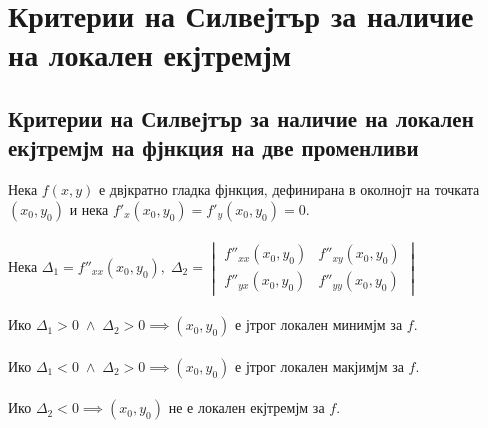 \documentclass[14pt]{extarticle}
\begin{document}
\section*{Критерии на Силвејтър за наличие на локален екјтремјм}
\subsection*{Критерии на Силвејтър за наличие на локален екјтремјм на фјнкция на две променливи}
Нека \(f(x,y)\) е двјкратно гладка фјнкция, дефинирана в околнојт на точката \((x_0,y_0)\) и нека \(f'_x(x_0, y_0) = f'_y(x_0,y_0) = 0\). \\\\
Нека \(\Delta_1 = f''_{xx}(x_0, y_0), \; \Delta_2 = \begin{vmatrix}
    f''_{xx}(x_0, y_0) & f''_{xy}(x_0, y_0) \\
    f''_{yx}(x_0, y_0) & f''_{yy}(x_0, y_0)
\end{vmatrix} \) \\\\
Ико \(\Delta_1 > 0 \; \land \; \Delta_2 > 0 \implies (x_0, y_0)\) е јтрог локален минимјм за \(f\). \\\\
Ико \(\Delta_1 < 0 \; \land \; \Delta_2 > 0 \implies (x_0, y_0)\) е јтрог локален макјимјм за \(f\). \\\\
Ико \(\Delta_2 < 0 \implies (x_0, y_0)\) не е локален екјтремјм за \(f\).
\end{document}
